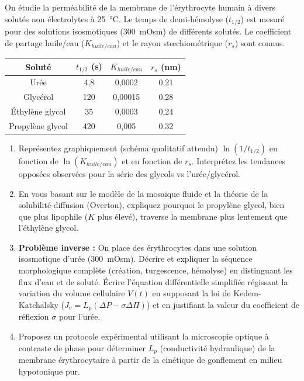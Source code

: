 \documentclass[11pt]{article}
\begin{document}
\begin{exercice}
On étudie la perméabilité de la membrane de l'érythrocyte humain à divers solutés non électrolytes à \SI{25}{\celsius}. Le temps de demi-hémolyse ($t_{1/2}$) est mesuré pour des solutions isosmotiques (\SI{300}{mOsm}) de différents solutés. Le coefficient de partage huile/eau ($K_{huile/eau}$) et le rayon stœchiométrique ($r_s$) sont connus.

\begin{center}
\begin{tabular}{|c|c|c|c|}
\hline
Soluté & $t_{1/2}$ (s) & $K_{huile/eau}$ & $r_s$ (nm) \\
\hline
Urée & 4,8 & 0,0002 & 0,21 \\
Glycérol & 120 & 0,00015 & 0,28 \\
Éthylène glycol & 35 & 0,0003 & 0,24 \\
Propylène glycol & 420 & 0,005 & 0,32 \\
\hline
\end{tabular}
\end{center}

\begin{enumerate}
    \item Représentez graphiquement (schéma qualitatif attendu) $\ln(1/t_{1/2})$ en fonction de $\ln(K_{huile/eau})$ et en fonction de $r_s$. Interprétez les tendances opposées observées pour la série des glycols vs l'urée/glycérol.
    \item En vous basant sur le modèle de la mosaïque fluide et la théorie de la solubilité-diffusion (Overton), expliquez pourquoi le propylène glycol, bien que plus lipophile ($K$ plus élevé), traverse la membrane plus lentement que l'éthylène glycol.
    \item \textbf{Problème inverse :} On place des érythrocytes dans une solution isosmotique d'urée (\SI{300}{mOsm}). Décrire et expliquer la séquence morphologique complète (création, turgescence, hémolyse) en distinguant les flux d'eau et de soluté. Écrire l'équation différentielle simplifiée régissant la variation du volume cellulaire $V(t)$ en supposant la loi de Kedem-Katchalsky ($J_v = L_p(\Delta P - \sigma \Delta \Pi)$) et en justifiant la valeur du coefficient de réflexion $\sigma$ pour l'urée.
    \item Proposez un protocole expérimental utilisant la microscopie optique à contraste de phase pour déterminer $L_p$ (conductivité hydraulique) de la membrane érythrocytaire à partir de la cinétique de gonflement en milieu hypotonique pur.
\end{enumerate}
\end{exercice}
\end{document}
